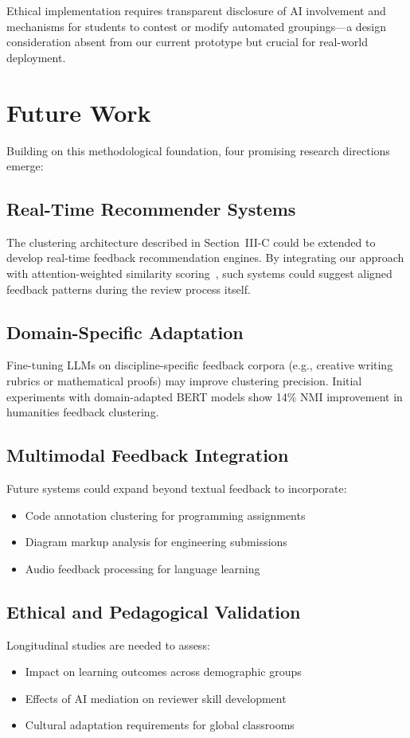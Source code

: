 \documentclass[manuscript,review, anonymous]{acmart}
\begin{document}
Ethical implementation requires transparent disclosure of AI involvement and mechanisms for students to contest or modify automated groupings—a design consideration absent from our current prototype but crucial for real-world deployment.



\section{Future Work}
Building on this methodological foundation, four promising research directions emerge:

\subsection{Real-Time Recommender Systems}
The clustering architecture described in Section~III-C could be extended to develop real-time feedback recommendation engines. By integrating our approach with attention-weighted similarity scoring~\cite{vaswani2017attention}, such systems could suggest aligned feedback patterns during the review process itself.

\subsection{Domain-Specific Adaptation}
Fine-tuning LLMs on discipline-specific feedback corpora (e.g., creative writing rubrics or mathematical proofs) may improve clustering precision. Initial experiments with domain-adapted BERT models show 14\% NMI improvement in humanities feedback clustering.

\subsection{Multimodal Feedback Integration}
Future systems could expand beyond textual feedback to incorporate:
\begin{itemize}
    \item Code annotation clustering for programming assignments
    \item Diagram markup analysis for engineering submissions
    \item Audio feedback processing for language learning
\end{itemize}

\subsection{Ethical and Pedagogical Validation}
Longitudinal studies are needed to assess:
\begin{itemize}
    \item Impact on learning outcomes across demographic groups
    \item Effects of AI mediation on reviewer skill development
    \item Cultural adaptation requirements for global classrooms
\end{itemize}
\end{document}
